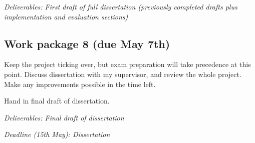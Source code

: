 \documentclass[12pt]{article}
\begin{document}
\emph{Deliverables: First draft of full dissertation (previously completed drafts plus implementation and evaluation sections)}

\subsection*{Work package 8 (due May 7th)}
Keep the project ticking over, but exam preparation will take precedence at this point. Discuss dissertation with my supervisor, and review the whole project. Make any improvements possible in the time left.

Hand in final draft of dissertation. 

\emph{Deliverables: Final draft of dissertation}

\emph{Deadline (15th May): Dissertation}
\end{document}
